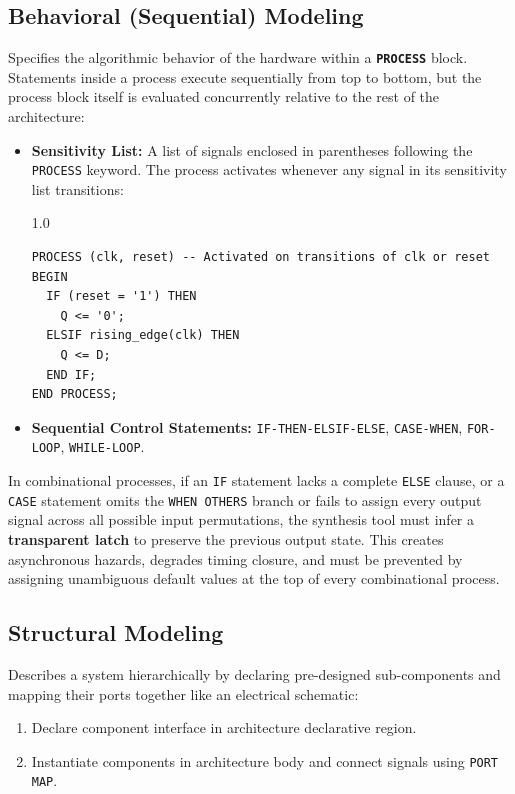 \documentclass[12pt,a4paper]{article}
\begin{document}
\subsection{Behavioral (Sequential) Modeling}
Specifies the algorithmic behavior of the hardware within a \textbf{\texttt{PROCESS}} block. Statements inside a process execute sequentially from top to bottom, but the process block itself is evaluated concurrently relative to the rest of the architecture:
\begin{itemize}[leftmargin=*, itemsep=3pt]
  \item \textbf{Sensitivity List:} A list of signals enclosed in parentheses following the \texttt{PROCESS} keyword. The process activates whenever any signal in its sensitivity list transitions:
\begin{spacing}{1.0}
\begin{verbatim}
PROCESS (clk, reset) -- Activated on transitions of clk or reset
BEGIN
  IF (reset = '1') THEN
    Q <= '0';
  ELSIF rising_edge(clk) THEN
    Q <= D;
  END IF;
END PROCESS;
\end{verbatim}
\end{spacing}
  \item \textbf{Sequential Control Statements:} \texttt{IF-THEN-ELSIF-ELSE}, \texttt{CASE-WHEN}, \texttt{FOR-LOOP}, \texttt{WHILE-LOOP}.
\end{itemize}

\begin{tcolorbox}[defbox, title={\textbf{Critical Synthesis Hazard: Inferred Latches}}]
In combinational processes, if an \texttt{IF} statement lacks a complete \texttt{ELSE} clause, or a \texttt{CASE} statement omits the \texttt{WHEN OTHERS} branch or fails to assign every output signal across all possible input permutations, the synthesis tool must infer a \textbf{transparent latch} to preserve the previous output state. This creates asynchronous hazards, degrades timing closure, and must be prevented by assigning unambiguous default values at the top of every combinational process.
\end{tcolorbox}

\subsection{Structural Modeling}
Describes a system hierarchically by declaring pre-designed sub-components and mapping their ports together like an electrical schematic:
\begin{enumerate}[label=\arabic*., leftmargin=*]
  \item Declare component interface in architecture declarative region.
  \item Instantiate components in architecture body and connect signals using \texttt{PORT MAP}.
\end{enumerate}
\end{document}
